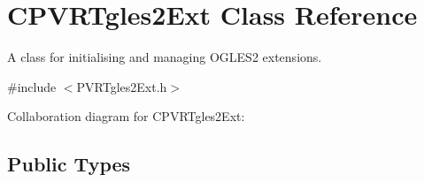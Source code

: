 \hypertarget{class_c_p_v_r_tgles2_ext}{\section{C\+P\+V\+R\+Tgles2\+Ext Class Reference}
\label{class_c_p_v_r_tgles2_ext}
}


A class for initialising and managing O\+G\+L\+E\+S2 extensions.  




{\ttfamily \#include $<$P\+V\+R\+Tgles2\+Ext.\+h$>$}



Collaboration diagram for C\+P\+V\+R\+Tgles2\+Ext\+:
\subsection*{Public Types}

